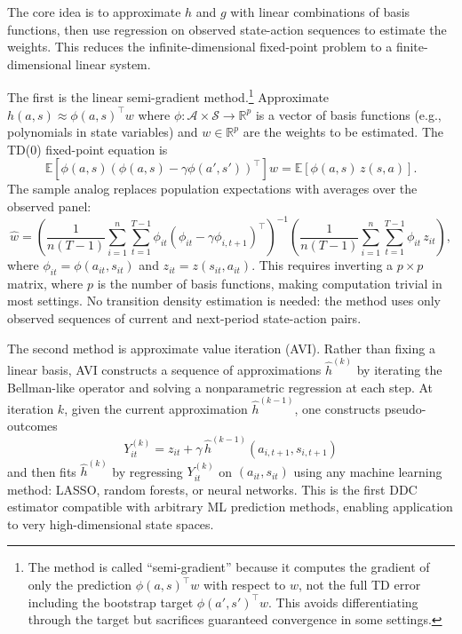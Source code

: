 The core idea is to approximate $h$ and $g$ with linear combinations of basis functions, then use regression on observed state-action sequences to estimate the weights. This reduces the infinite-dimensional fixed-point problem to a finite-dimensional linear system.

The first is the linear semi-gradient method.\footnote{The method is called ``semi-gradient'' because it computes the gradient of only the prediction $\phi(a,s)^\top w$ with respect to $w$, not the full TD error including the bootstrap target $\phi(a',s')^\top w$. This avoids differentiating through the target but sacrifices guaranteed convergence in some settings.} Approximate $h(a,s) \approx \phi(a,s)^\top w$ where $\phi: \mathcal{A} \times \mathcal{S} \to \mathbb{R}^p$ is a vector of basis functions (e.g., polynomials in state variables) and $w \in \mathbb{R}^p$ are the weights to be estimated. The TD(0) fixed-point equation is
\begin{equation}
\mathbb{E}\left[\phi(a,s)\left(\phi(a,s) - \gamma \phi(a', s')\right)^\top\right] w = \mathbb{E}\left[\phi(a,s) \, z(s,a)\right]. \label{eq:ae_semigradient}
\end{equation}
The sample analog replaces population expectations with averages over the observed panel:
\begin{equation}
\hat{w} = \left(\frac{1}{n(T-1)} \sum_{i=1}^n \sum_{t=1}^{T-1} \phi_{it}\left(\phi_{it} - \gamma \phi_{i,t+1}\right)^\top\right)^{-1} \left(\frac{1}{n(T-1)} \sum_{i=1}^n \sum_{t=1}^{T-1} \phi_{it} \, z_{it}\right),
\end{equation}
where $\phi_{it} = \phi(a_{it}, s_{it})$ and $z_{it} = z(s_{it}, a_{it})$. This requires inverting a $p \times p$ matrix, where $p$ is the number of basis functions, making computation trivial in most settings. No transition density estimation is needed: the method uses only observed sequences of current and next-period state-action pairs.

The second method is approximate value iteration (AVI). Rather than fixing a linear basis, AVI constructs a sequence of approximations $\hat{h}^{(k)}$ by iterating the Bellman-like operator and solving a nonparametric regression at each step. At iteration $k$, given the current approximation $\hat{h}^{(k-1)}$, one constructs pseudo-outcomes
\begin{equation}
Y_{it}^{(k)} = z_{it} + \gamma \, \hat{h}^{(k-1)}(a_{i,t+1}, s_{i,t+1})
\end{equation}
and then fits $\hat{h}^{(k)}$ by regressing $Y_{it}^{(k)}$ on $(a_{it}, s_{it})$ using any machine learning method: LASSO, random forests, or neural networks. This is the first DDC estimator compatible with arbitrary ML prediction methods, enabling application to very high-dimensional state spaces.


